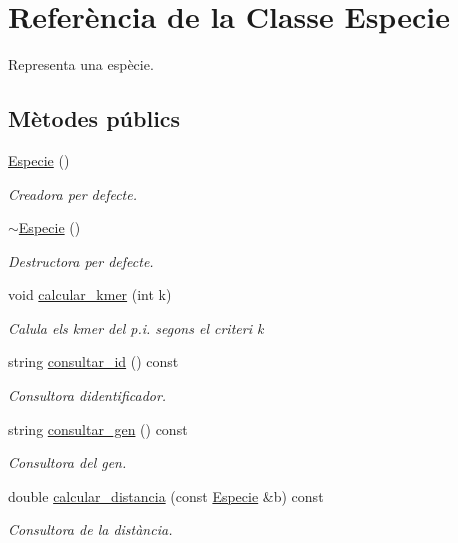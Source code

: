 \hypertarget{class_especie}{}\section{Referència de la Classe Especie}
\label{class_especie}


Representa una espècie.  


\subsection*{Mètodes públics}
\begin{DoxyCompactItemize}
\item 
\hyperlink{class_especie_a272c2488719cc9874b2f174906675b3d}{Especie} ()
\begin{DoxyCompactList}\small\item\em Creadora per defecte. \end{DoxyCompactList}\item 
\hyperlink{class_especie_abd21378dde6e8348d823c6f87a1c0658}{$\sim$\+Especie} ()
\begin{DoxyCompactList}\small\item\em Destructora per defecte. \end{DoxyCompactList}\item 
void \hyperlink{class_especie_a83fdef791142b0887bfa7f45bd0d5e0e}{calcular\+\_\+kmer} (int k)
\begin{DoxyCompactList}\small\item\em Calula els {\itshape kmer} del p.\+i. segons el criteri {\itshape k} \end{DoxyCompactList}\item 
string \hyperlink{class_especie_a1652f05cd2ff7dc71123bf538ecc4476}{consultar\+\_\+id} () const
\begin{DoxyCompactList}\small\item\em Consultora d\textquotesingle{}identificador. \end{DoxyCompactList}\item 
string \hyperlink{class_especie_a850af2b59a21e2d801c59d76ba5c1a98}{consultar\+\_\+gen} () const
\begin{DoxyCompactList}\small\item\em Consultora del gen. \end{DoxyCompactList}\item 
double \hyperlink{class_especie_aa7556bc4f5e708a9f918125614ecbb38}{calcular\+\_\+distancia} (const \hyperlink{class_especie}{Especie} \&b) const
\begin{DoxyCompactList}\small\item\em Consultora de la distància. \end{DoxyCompactList}\item 

\end{DoxyCompactItemize}
